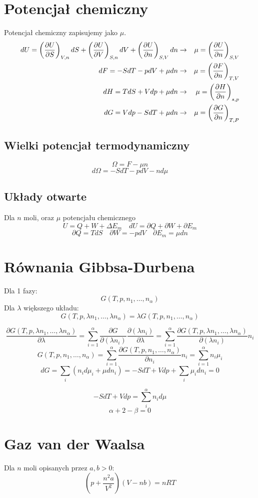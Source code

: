 \documentclass{../notatki}
\begin{document}
\section{Potencjał chemiczny}

Potencjał chemiczny zapisujemy jako $\mu$.
$$
\begin{aligned}
  dU = \left(\frac{\partial U}{\partial S}\right)_{V, n} dS + \left(\frac{\partial U}{\partial V}\right)_{S, n} dV +
  \left(\frac{\partial U}{\partial n}\right)_{S, V} dn &\rightarrow& \mu = \left(\frac{\partial U}{\partial n}\right)_{S, V} \\
  dF = -SdT - pdV + \mu dn &\rightarrow& \mu = \left(\frac{\partial F}{\partial n}\right)_{T, V} \\
  dH = TdS + Vdp + \mu dn &\rightarrow& \mu = \left(\frac{\partial H}{\partial n}\right)_{s, p} \\
  dG = Vdp - SdT + \mu dn & \rightarrow & \mu = \left(\frac{\partial G}{\partial n}\right)_{T,P}
\end{aligned}
$$

\subsection{Wielki potencjał termodynamiczny}

$$
\Omega = F - \mu n
$$
$$
d\Omega = -SdT - pdV - nd\mu
$$

\subsection{Układy otwarte}

Dla $n$ moli, oraz $\mu$ potencjału chemicznego
$$
U = Q + W + \Delta E_m \quad dU = \partial Q + \partial W + \partial E_m
$$
$$
\partial Q = TdS \quad \partial W = -pdV \quad \partial E_m = \mu dn
$$

\section{Równania Gibbsa-Durbena}

\begin{examplebox}
  Dla 1 fazy:
  $$
  G(T, p, n_1, \dots, n_\alpha)
  $$
  Dla $\lambda$ większego układu:
  $$
  G(T, p, \lambda n_1, \dots, \lambda n_\alpha) = \lambda G(T, p,
  n_1, \dots, n_\alpha)
  $$

  $$
  \frac{\partial G(T, p, \lambda n_1, \dots, \lambda
  n_\alpha)}{\partial \lambda} = \sum_{i=1}^\alpha \frac{\partial
  G}{\partial (\lambda n_i)} \frac{\partial (\lambda n_i)}{\partial
  \lambda} = \sum_{i=1}^\alpha \frac{\partial G(T, p, \lambda n_1,
  \ldots, \lambda n_\alpha)}{\partial (\lambda n_i)} n_i
  $$
  $$
  G(T, p, n_1, \ldots, n_\alpha) = \sum_{i=1}^\alpha \frac{\partial
  G(T, p, n_1, \ldots, n_\alpha)}{\partial n_i} n_i = \sum_{i=1}^\alpha
  n_i \mu_i
  $$
  $$
  dG = \sum_i \left(n_i d\mu_i + \mu d n_i\right) = -SdT + Vdp +
  \sum_i \mu_i dn_i = 0
  $$
\end{examplebox}

$$
-SdT + Vdp = \sum_i^\alpha n_i d\mu
$$
$$
\alpha + 2 - \beta = 0
$$

\section{Gaz van der Waalsa}

Dla $n$ moli opisanych przez $a, b > 0$:
$$
\left(p + \frac{n^2a}{V^2}\right)\left(V - nb\right) = nRT
$$
\end{document}
